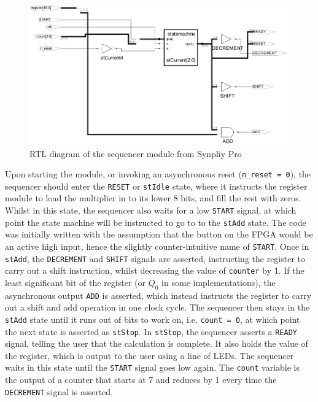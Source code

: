 \documentclass[a4paper,11pt]{article}
\begin{document}
\begin{figure}
    \centering
        \includegraphics[scale=0.17]{./RTL/sequencer_c.png}
    \caption{RTL diagram of the sequencer module from Synpliy Pro}
    \label{fig:seqRTL}
\end{figure}

Upon starting the module, or invoking an asynchronous reset (\lstinline{n_reset = 0}), the sequencer should enter the \lstinline{RESET} or \lstinline{stIdle} state, where it instructs the register module to load the multiplier in to its lower 8 bits, and fill the rest with zeros. Whilst in this state, the sequencer also waits for a low \lstinline{START} signal, at which point the state machine will be instructed to go to to the \lstinline{stAdd} state. The code was initially written with the assumption that the button on the FPGA would be an active high input, hence the slightly counter-intuitive name of \lstinline{START}. Once in \lstinline{stAdd}, the \lstinline{DECREMENT} and \lstinline{SHIFT} signals are asserted, instructing the register to carry out a shift instruction, whilst decreasing the value of \lstinline{counter} by 1. If the least significant bit of the register (or $Q_0$ in some implementations), the asynchronous output \lstinline{ADD} is asserted, which instead instructs the register to carry out a shift and add operation in one clock cycle. The sequencer then stays in the \lstinline{stAdd} state until it runs out of bits to work on, i.e. \lstinline{count = 0}, at which point the next state is asserted as \lstinline{stStop}. In \lstinline{stStop}, the sequencer asserts a \lstinline{READY} signal, telling the user that the calculation is complete. It also holds the value of the register, which is output to the user using a line of LEDs. The sequencer waits in this state until the \lstinline{START} signal goes low again. The \lstinline{count} variable is the output of a counter that starts at 7 and reduces by 1 every time the \lstinline{DECREMENT} signal is asserted.
\end{document}
